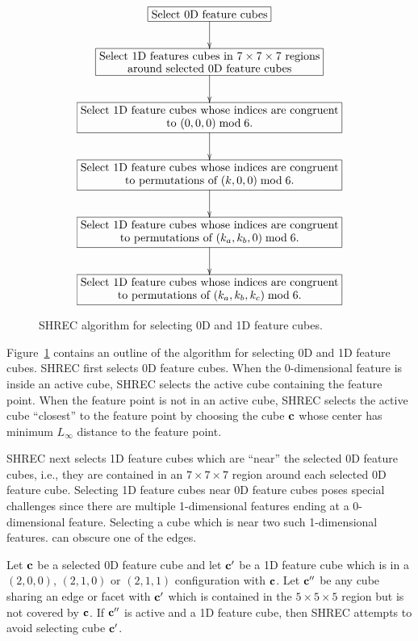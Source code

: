 \begin{figure}
\begin{equation*}
\xymatrix{
\action{Select 0D feature cubes} \ar[d] \\
\action{Select 1D features cubes in $7 \times 7 \times 7$ regions \\
around selected 0D feature cubes} \ar[d] \\
\action{Select 1D feature cubes whose indices are congruent \\
to $(0,0,0) \bmod 6$.} \ar[d] \\
\action{Select 1D feature cubes whose indices are congruent \\
to permutations of $(k,0,0) \bmod 6$.} \ar[d] \\
\action{Select 1D feature cubes whose indices are congruent \\
to permutations of $(k_a,k_b,0) \bmod 6$.} \ar[d] \\
\action{Select 1D feature cubes whose indices are congruent \\
to permutations of $(k_a,k_b,k_c) \bmod 6$.}
}
\end{equation*}
\caption{SHREC algorithm for selecting 0D and 1D feature cubes.}
\label{alg:SHREC_select}
\end{figure}

Figure~\ref{alg:SHREC_select} contains an outline of the algorithm 
for selecting 0D and 1D feature cubes.
SHREC first selects 0D feature cubes.
When the 0-dimensional feature is inside an active cube,
SHREC selects the active cube containing the feature point.
When the feature point is not in an active cube,
SHREC selects the active cube ``closest'' to the feature point
by choosing the cube $\mathbf{c}$ whose center has minimum $L_\infty$ distance
to the feature point.

SHREC next selects 1D feature cubes which are ``near'' 
the selected 0D feature cubes,
i.e., they are contained in an $7 \times 7 \times 7$ region
around each selected 0D feature cube.
Selecting 1D feature cubes near 0D feature cubes poses special challenges
since there are multiple 1-dimensional features ending 
at a 0-dimensional feature.
Selecting a cube which is near two such 1-dimensional features.
can obscure one of the edges.

Let $\mathbf{c}$ be a selected 0D feature cube and let $\mathbf{c}'$ be a 1D feature cube
which is in a $(2,0,0)$, $(2,1,0)$ or $(2,1,1)$ configuration with $\mathbf{c}$.
Let $\mathbf{c}''$ be any cube sharing an edge or facet with $\mathbf{c}'$
which is contained in the $5 \times 5 \times 5$ region
but is not covered by $\mathbf{c}$.
If $\mathbf{c}''$ is active and a 1D feature cube,
then SHREC attempts to avoid selecting cube $\mathbf{c}'$.

